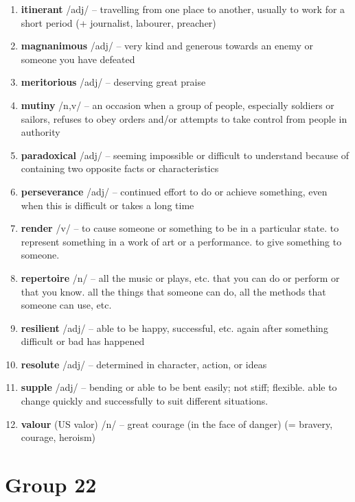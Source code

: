 \begin{enumerate}[wide,labelindent=0pt]
\item \textbf{itinerant} /adj/ -- travelling from one place to another, usually to work for a short period (+ journalist, labourer, preacher)
\item \textbf{magnanimous} /adj/ -- very kind and generous towards an enemy or someone you have defeated
\item \textbf{meritorious} /adj/ -- deserving great praise
\item \textbf{mutiny} /n,v/ -- an occasion when a group of people, especially soldiers or sailors, refuses to obey orders and/or attempts to take control from people in authority
\item \textbf{paradoxical} /adj/ -- seeming impossible or difficult to understand because of containing two opposite facts or characteristics
\item \textbf{perseverance} /adj/ -- continued effort to do or achieve something, even when this is difficult or takes a long time
\item \textbf{render} /v/ --  to cause someone or something to be in a particular state.  to represent something in a work of art or a performance.  to give something to someone.
\item \textbf{repertoire} /n/ --  all the music or plays, etc. that you can do or perform or that you know.  all the things that someone can do, all the methods that someone can use, etc.
\item \textbf{resilient} /adj/ -- able to be happy, successful, etc. again after something difficult or bad has happened
\item \textbf{resolute} /adj/ -- determined in character, action, or ideas
\item \textbf{supple} /adj/ --  bending or able to be bent easily; not stiff; flexible.  able to change quickly and successfully to suit different situations.
\item \textbf{valour} (US valor) /n/ -- great courage (in the face of danger) (= bravery, courage, heroism)
\end{enumerate}

\newpage
\section{Group 22}

